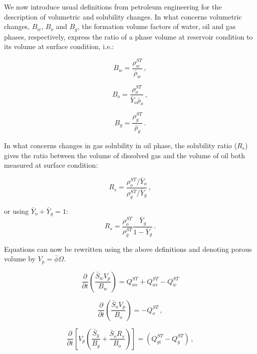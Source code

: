 \documentclass[authoryear,preprint,review,11pt]{elsarticle}
\begin{document}
We now introduce usual definitions from petroleum engineering for the description of volumetric and solubility changes. In what concerns volumetric changes, $B_w$, $B_o$ and $B_g$, the formation volume factors of water, oil and gas phases, respectively, express the ratio of a phase volume at reservoir condition to its volume at surface condition, i.e.:

\begin{equation}\label{eq: Bw}
B_w = \frac{\rho_w^{ST}}{\bar{\rho}_w} \, ,
\end{equation}

\begin{equation}\label{eq: Bo}
B_o = \frac{\rho_o^{ST}}{\bar{Y}_o \bar{\rho}_o} \, ,
\end{equation}

\begin{equation}\label{eq: Bg}
B_g = \frac{\rho_g^{ST}}{\bar{\rho}_g} \, .
\end{equation}

In what concerns changes in gas solubility in oil phase, the solubility ratio ($R_s$) gives the ratio between the volume of dissolved gas and the volume of oil both measured at surface condition:

\begin{equation}
R_s = \frac{\rho_o^{ST} / \bar{Y}_o}{\rho_g^{ST} / \bar{Y}_g} \, ,
\end{equation}

or using $\bar{Y}_o + \bar{Y}_g = 1$:
\begin{equation}
R_s = \frac{\rho_o^{ST}}{\rho_g^{ST}}\frac{\bar{Y}_g}{1-\bar{Y}_g} \, .
\end{equation}

Equations can now be rewritten using the above definitions and denoting porous volume by $V_p = \bar{\phi}\Omega$.

\begin{equation}\label{eq: Sw4}
\frac{\partial}{\partial t} \left(\frac{\bar{S}_w V_p}{B_w} \right) = Q_{we}^{ST} + Q_{wi}^{ST}-Q_w^{ST}
\end{equation}

\begin{equation}\label{eq: So4}
\frac{\partial}{\partial t} \left(\frac{\bar{S}_o V_p}{B_o} \right) = - Q_o^{ST} \, ,
\end{equation}

\begin{equation}\label{eq: Sg4}
\frac{\partial}{\partial t} \left[ V_p \left(\frac{\bar{S}_g}{B_g} + \frac{\bar{S}_o R_s}{B_o} \right) \right] = \left( Q_{gi}^{ST}-Q_g^{ST} \right) \, ,
\end{equation}
\end{document}
